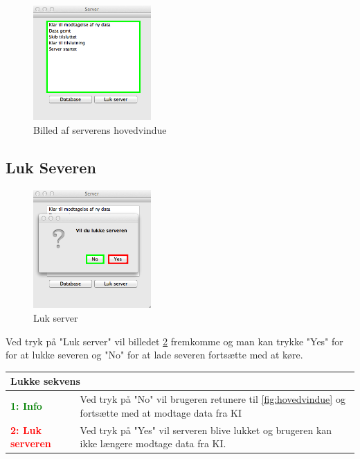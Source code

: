 \begin{figure}[htbp]
	\centering
	\includegraphics[width=0.4\textwidth]{billeder/database/server_on}
	\caption{Billed af serverens hovedvindue}
	\label{fig:server_on}
\end{figure}


\subsection*{Luk Severen}
\begin{figure}[H]
	\centering
	\includegraphics[width=0.4\textwidth]{billeder/database/databaseLogOff}
	\caption{Luk server}
	\label{fig:databselLogOff}
\end{figure}
Ved tryk på "Luk server" vil billedet \ref{fig:databselLogOff} fremkomme og man kan trykke "Yes" for for at lukke severen og "No" for at lade severen fortsætte med at køre.

\begin{table}[H]
\begin{tabular}{l p{12.5cm}}
\multicolumn{2}{l}{Lukke sekvens} \\
\hline
\textcolor{green}{\textbf{1: Info}}
&Ved tryk på "No" vil brugeren retunere til \ref{fig:hovedvindue} og fortsætte med at modtage data fra KI\\

\textcolor{red}{\textbf{2: Luk serveren}}
&Ved tryk på "Yes" vil serveren blive lukket og brugeren kan ikke længere modtage data fra KI.\\

\end{tabular}
\end{table}


